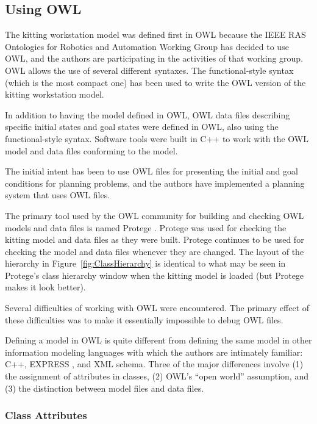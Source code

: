 \subsection{Using OWL}

The kitting workstation model was defined first in OWL because the IEEE RAS
Ontologies for Robotics and Automation Working Group has decided to use
OWL, and the authors are participating in the activities of that working
group. OWL allows the use of several different syntaxes. The
functional-style syntax (which is the most compact one) has been used to
write the OWL version of the kitting workstation model.

In addition to having the model defined in OWL, OWL data files describing
specific initial states and goal states were defined in OWL, also using the
functional-style syntax.  Software tools were built in C++ to work with the
OWL model and data files conforming to the model.

The initial intent has been to use OWL files for presenting the initial and
goal conditions for planning problems, and the authors have implemented a
planning system that uses OWL files.

The primary tool used by the OWL community for building and checking OWL
models and data files is named Protege \cite{Horridge.2011}. Protege was
used for checking the kitting model and data files as they were
built. Protege continues to be used for checking the model and data files
whenever they are changed. The layout of the hierarchy in
Figure~\ref{fig:ClassHierarchy} is identical to what may be seen in
Protege's class hierarchy window when the kitting model is loaded (but
Protege makes it look better).

Several difficulties of working with OWL were encountered. The primary
effect of these difficulties was to make it essentially impossible to
debug OWL files.

Defining a model in OWL is quite different from defining the same model in
other information modeling languages with which the authors are intimately
familiar: C++, EXPRESS \cite{EXPRESSmanual}, and XML schema. Three of the
major differences involve (1) the assignment of attributes in classes, (2)
OWL's ``open world'' assumption, and (3) the distinction between model
files and data files.\\

\subsubsection{Class Attributes}

